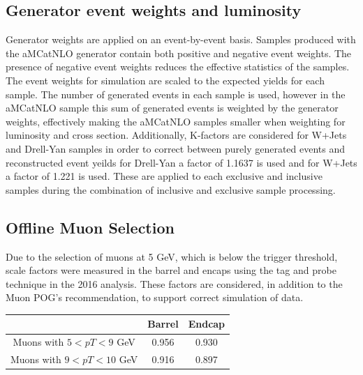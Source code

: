 
\subsection{Generator event weights and luminosity}

Generator weights are applied on an event-by-event basis. Samples produced with the aMCatNLO generator contain both positive and negative event weights. The presence of negative event weights reduces the
effective statistics of the samples.
The event weights for simulation are scaled to the expected yields for each sample. The number
of generated events in each sample is used, however in the aMCatNLO sample this sum of
generated events is weighted by the generator weights, effectively making the aMCatNLO
samples smaller when weighting for luminosity and cross section.
Additionally, K-factors are considered for W+Jets and Drell-Yan samples in order to correct between purely generated events and reconstructed event yeilds for Drell-Yan a factor of 1.1637 is used and for W+Jets a factor of 1.221 is used. These are applied to each exclusive and inclusive samples during the combination of inclusive and exclusive sample processing.   
%
%

\subsection{Offline Muon Selection}
Due to the selection of muons at 5 GeV, which is below the trigger threshold, scale factors were measured in the barrel and encaps using the tag and probe technique in the 2016 analysis. These factors are considered, in addition to the Muon POG's recommendation, to support correct simulation of data. 
\begin{table}[h!tbp]
\centering
{}
\begin{tabular*}{0.6\textwidth}{c|c|c}
   & Barrel & Endcap \\\hline
Muons with $5 < pT < 9$ GeV & 0.956 & 0.930\\\hline
Muons with $9 < pT < 10$ GeV & 0.916 & 0.897\\\hline 
\end{tabular*}
\end{table}


